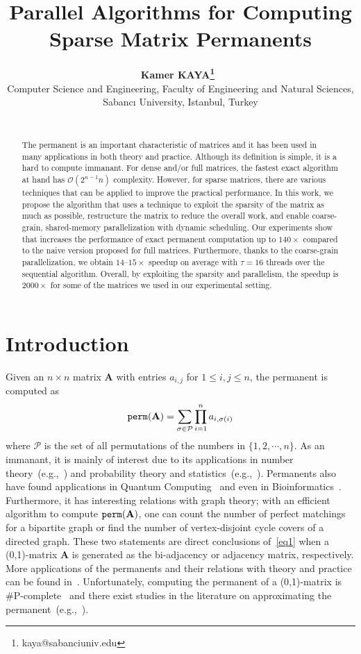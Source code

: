 \documentclass{elektr}
\title{Parallel Algorithms for Computing Sparse Matrix Permanents}
\author[Kamer Kaya]{
\textbf{Kamer KAYA\thanks{kaya@sabanciuniv.edu}~\href{https://orcid.org/0000-0001-8678-5467}{\orc}}\\
Computer Science and Engineering, Faculty of Engineering and Natural Sciences, Sabanc{\i} University, Istanbul, Turkey\\
\\ [1.8em]

\rec{.201}
\acc{.201}
\finv{..201}
}
\newcommand{\Ab}{\mathbf{A}}
\begin{document}
\maketitle


\begin{abstract}
The permanent is an important characteristic of matrices and it has been used in many applications in both theory and practice. Although its definition is simple, it is a hard to compute immanant. For dense and/or full matrices, the fastest exact algorithm at hand has $\mathcal{O}(2^{n-1}n)$ complexity. However, for sparse matrices, there are various techniques that can be applied to improve the practical performance. In this work, we propose the algorithm {} that uses a technique to exploit the sparsity of the matrix as much as possible, restructure the matrix to reduce the overall work, and enable coarse-grain, shared-memory parallelization with dynamic scheduling. Our experiments show that {} increases the performance of exact permanent computation up to $140\times$ compared to the naive version proposed for full matrices. Furthermore, thanks to the coarse-grain parallelization, we obtain $14$--$15\times$ speedup on average with $\tau = 16$ threads over the sequential algorithm. Overall, by exploiting the sparsity and parallelism, the speedup is $2000\times$ for some of the matrices we used in our experimental setting.   
\end{abstract}

\section{Introduction}\label{Int}
Given an $n \times n$ matrix $\Ab$ with entries $a_{i,j}$ for $1 \leq i,j \leq n$, the permanent is computed as 
\begin{equation}
{\tt perm}(\Ab) = \sum_{\sigma \in {\mathcal P}}{\prod_{i=1}^{n}a_{i, \sigma(i)}} \label{eq1}
\end{equation}
where ${\mathcal P}$ is the set of all permutations of the numbers in $\{1, 2, \cdots, n\}$. As an immanant, it is mainly of interest due to its applications in number theory~(e.g.,~\cite{kilic07}) and probability theory and statistics~(e.g.,~\cite{balakrishnan07}).  
Permanents also have found applications in Quantum Computing~\cite{aaronson11} and even in Bioinformatics~\cite{narahara13}. 
Furthermore, it has interesting relations with graph theory; with an efficient algorithm to compute ${\tt perm}(\Ab)$, one can count the number of perfect matchings for a bipartite graph or find the number of vertex-disjoint cycle covers of a directed graph. These two statements are direct conclusions of~\eqref{eq1} when a (0,1)-matrix $\Ab$ is generated as the bi-adjacency or adjacency matrix, respectively. More applications of the permanents and their relations with theory and practice can be found in~\cite{minc84}.
Unfortunately, computing the permanent of a (0,1)-matrix is \#P-complete~\cite{valiant79} and there exist studies in the literature on approximating the permanent~(e.g.,~\cite{dufosse18}).  
\end{document}
